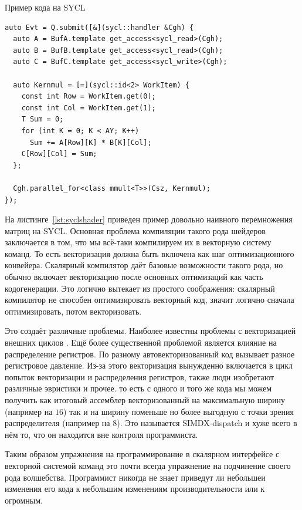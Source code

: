 \begin{ListingEnv}[!h]
    \captiondelim{ } 
    \caption{Пример кода на SYCL}\label{lst:syclshader}
    \begin{lstlisting}[language={[ISO]C++}]
auto Evt = Q.submit([&](sycl::handler &Cgh) {
  auto A = BufA.template get_access<sycl_read>(Cgh);
  auto B = BufB.template get_access<sycl_read>(Cgh);
  auto C = BufC.template get_access<sycl_write>(Cgh);

  auto Kernmul = [=](sycl::id<2> WorkItem) {
    const int Row = WorkItem.get(0);
    const int Col = WorkItem.get(1);
    T Sum = 0;
    for (int K = 0; K < AY; K++)
      Sum += A[Row][K] * B[K][Col];
    C[Row][Col] = Sum;
  };

  Cgh.parallel_for<class mmult<T>>(Csz, Kernmul);
});
    \end{lstlisting}
\end{ListingEnv}

На листинге~\cref{lst:syclshader} приведен пример довольно наивного перемножения матриц на SYCL. Основная проблема компиляции такого рода шейдеров заключается в том, что мы всё-таки компилируем их в векторную систему команд. То есть векторизация должна быть включена как шаг оптимизационного конвейера. Скалярный компилятор \cite{weiss1987study} даёт базовые возможности такого рода, но обычно включает векторизацию после основных оптимизаций как часть кодогенерации. Это логично вытекает из простого соображения: скалярный компилятор не способен оптимизировать векторный код, значит логично сначала оптимизировать, потом векторизовать.

Это создаёт различные проблемы. Наиболее известны проблемы с векторизацией внешних циклов \cite{vasudevan1982inner}. Ещё более существенной проблемой является влияние на распределение регистров. По разному автовекторизованный код вызывает разное регистровое давление. Из-за этого векторизация вынужденно включается в цикл попыток векторизации и распределения регистров, также люди изобретают различные эвристики и прочее. то есть с одного и того же кода мы можем получить как итоговый ассемблер векторизованный на максимальную ширину (например на $16$) так и на ширину поменьше но более выгодную с точки зрения распределителя (например на $8$). Это называется SIMDX-dispatch и хуже всего в нём то, что он находится вне контроля программиста. 

Таким образом упражнения на программирование в скалярном интерфейсе с векторной системой команд это почти всегда упражнение на подчинение своего рода волшебства. Программист никогда не знает приведут ли небольшеи изменения его кода к небольшим изменениям производительности или к огромным.

